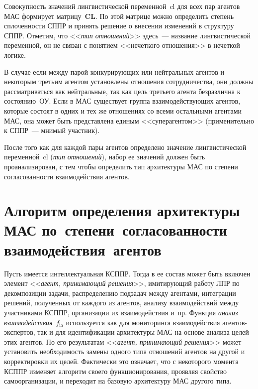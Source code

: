 \begin{multicols}{2}
  Совокупность значений лингвистической переменной~cl для всех пар 
агентов МАС формирует матрицу~\textbf{CL}. По этой матрице можно 
определить степень сплоченности СППР и принять решение о внесении 
изменений в структуру СППР. Отметим, что <<\textit{тип отношений}>> 
здесь~--- название лингвистической переменной, он не связан с понятием 
<<нечеткого отношения>> в нечеткой логике.
  
  В случае если между парой конкурирующих или нейтральных агентов и 
некоторым третьим агентом установлены отношения сотрудничества, они 
должны рассматриваться как нейтральные, так как цель третьего агента 
безразлична к состоянию~ОУ. Если в МАС существует группа 
взаимодействующих агентов, которые состоят в одних и тех же отношениях со 
всеми остальными агентами МАС, она может быть представлена единым 
<<суперагентом>> (применительно к СППР~--- мнимый участник).
  
  После того как для каждой пары агентов определено значение 
лингвистической переменной~cl (\textit{тип отношений}), набор ее значений 
должен быть проанализирован, с тем чтобы определить тип архитектуры МАС 
по степени согласованности взаимодействия агентов.
  
\section{Алгоритм определения архитектуры МАС по~степени~согласованности 
взаимодействия~агентов}
  
  Пусть имеется интеллектуальная \mbox{КСППР}. Тогда в ее состав может быть 
включен элемент <<\textit{агент, принимающий решения}>>, имитирующий 
работу ЛПР по декомпозиции задачи, распределению подзадач между 
агентами, интеграции решений, полученных от каждого из агентов, анализу 
взаимодействий между участниками \mbox{КСППР}, организации их взаимодействия и~пр. 
Функция \textit{анализ взаимодействия}~$f_{\mathrm{ia}}$ используется как для 
мониторинга взаимодействия агентов-экспертов, так и для идентификации 
архитектуры МАС на основе анализа целей этих агентов. По его результатам 
<<\textit{агент, принимающий решения}>> может установить необходимость 
замены одного типа отношений агентов на другой и корректировки их целей. 
Фактически это означает, что с некоторого момента \mbox{КСППР} изменяет алгоритм 
своего функционирования, проявляя свойство самоорганизации, и переходит на 
базовую архитектуру МАС другого типа.
  

\end{multicols}
